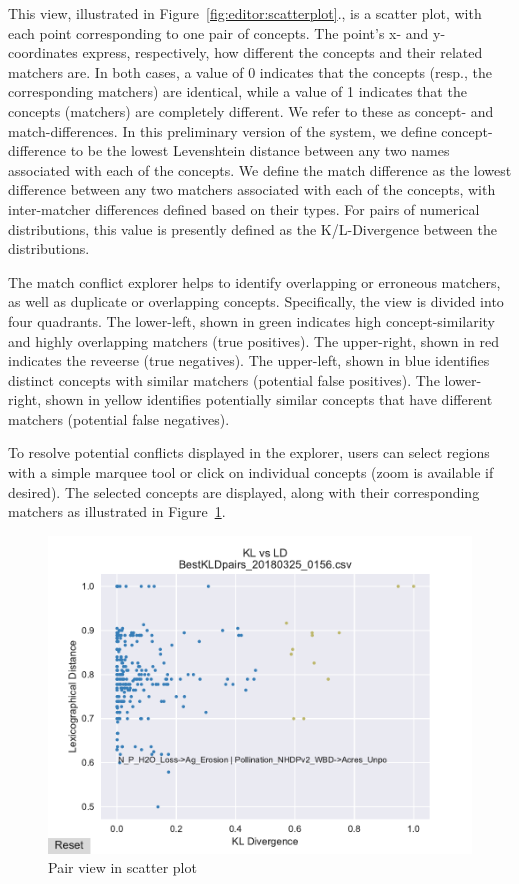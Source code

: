 This view, illustrated in Figure~\ref{fig:editor:scatterplot}., is a scatter plot, with each point corresponding to one pair of concepts.
The point's x- and y-coordinates express, respectively, how different the concepts and their related matchers are.
In both cases, a value of 0 indicates that the concepts (resp., the corresponding matchers) are identical, while a value of 1 indicates that the concepts (matchers) are completely different.
We refer to these as concept- and match-differences.
In this preliminary version of the system, we define concept-difference to be the lowest Levenshtein distance between any two names associated with each of the concepts.
We define the match difference as the lowest difference between any two matchers associated with each of the concepts, with inter-matcher differences defined based on their types.
For pairs of numerical distributions, this value is presently defined as the K/L-Divergence between the distributions.

The match conflict explorer helps to identify overlapping or erroneous matchers, as well as duplicate or overlapping concepts.
Specifically, the view is divided into four quadrants.  The lower-left, shown in green indicates high concept-similarity and highly overlapping matchers (true positives).  
The upper-right, shown in red indicates the reveerse (true negatives).
The upper-left, shown in blue identifies distinct concepts with similar matchers (potential false positives).  
The lower-right, shown in yellow identifies potentially similar concepts that have different matchers (potential false negatives).

To resolve potential conflicts displayed in the explorer, users can select regions with a simple marquee tool or click on individual concepts (zoom is available if desired).
The selected concepts are displayed, along with their corresponding matchers as illustrated in Figure~\ref{fig:pairview}.

\begin{figure}
	\centering
	\includegraphics[trim={0 0 0 15mm},clip,width=\columnwidth]{graphics/Pair_view_data_callouts}
	\caption{Pair view in scatter plot}
	\label{fig:pairview}
	\trimfigurespacing
\end{figure}


